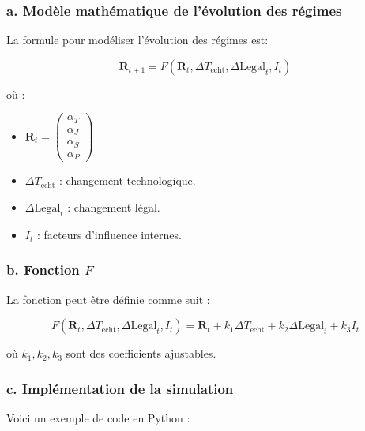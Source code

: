 \documentclass{article}
\begin{document}
\subsubsection{a. Modèle mathématique de l'évolution des régimes}
La formule pour modéliser l'évolution des régimes est:

\[
\mathbf{R}_{t+1} = F(\mathbf{R}_t, \Delta T_{\text{echt}}, \Delta \text{Legal}_t, I_t)
\]

où :
\begin{itemize}
    \item \( \mathbf{R}_t = \begin{pmatrix} \alpha_T \\ \alpha_J \\ \alpha_S \\ \alpha_P \end{pmatrix} \)
    \item \( \Delta T_{\text{echt}} \) : changement technologique.
    \item \( \Delta \text{Legal}_t \) : changement légal.
    \item \( I_t \) : facteurs d’influence internes.
\end{itemize}

\subsubsection{b. Fonction \( F \)}

La fonction peut être définie comme suit :

\[
F(\mathbf{R}_t, \Delta T_{\text{echt}}, \Delta \text{Legal}_t, I_t) = \mathbf{R}_t + k_1 \Delta T_{\text{echt}} + k_2 \Delta \text{Legal}_t + k_3 I_t
\]

où \( k_1, k_2, k_3 \) sont des coefficients ajustables.

\subsubsection{c. Implémentation de la simulation}
Voici un exemple de code en Python :
\end{document}
